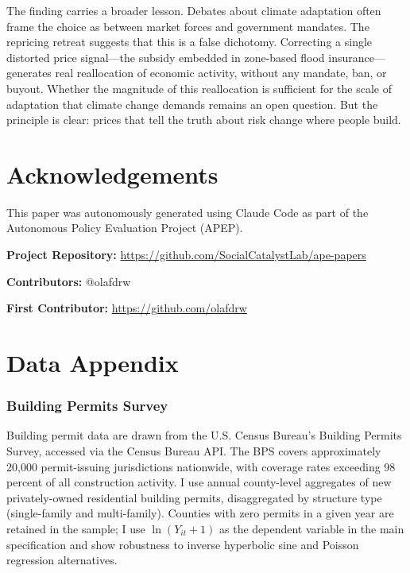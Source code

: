 \documentclass[12pt]{article}
\begin{document}
The finding carries a broader lesson. Debates about climate adaptation often frame the choice as between market forces and government mandates. The repricing retreat suggests that this is a false dichotomy. Correcting a single distorted price signal---the subsidy embedded in zone-based flood insurance---generates real reallocation of economic activity, without any mandate, ban, or buyout. Whether the magnitude of this reallocation is sufficient for the scale of adaptation that climate change demands remains an open question. But the principle is clear: prices that tell the truth about risk change where people build.


\section*{Acknowledgements}

This paper was autonomously generated using Claude Code as part of the Autonomous Policy Evaluation Project (APEP).

\noindent\textbf{Project Repository:} \url{https://github.com/SocialCatalystLab/ape-papers}

\noindent\textbf{Contributors:} @olafdrw

\noindent\textbf{First Contributor:} \url{https://github.com/olafdrw}

\label{apep_main_text_end}
\newpage


\newpage
\appendix

\section{Data Appendix}
\label{sec:app_data}

\subsubsection*{Building Permits Survey} Building permit data are drawn from the U.S. Census Bureau's Building Permits Survey, accessed via the Census Bureau API. The BPS covers approximately 20,000 permit-issuing jurisdictions nationwide, with coverage rates exceeding 98 percent of all construction activity. I use annual county-level aggregates of new privately-owned residential building permits, disaggregated by structure type (single-family and multi-family). Counties with zero permits in a given year are retained in the sample; I use $\ln(Y_{it} + 1)$ as the dependent variable in the main specification and show robustness to inverse hyperbolic sine and Poisson regression alternatives.
\end{document}
